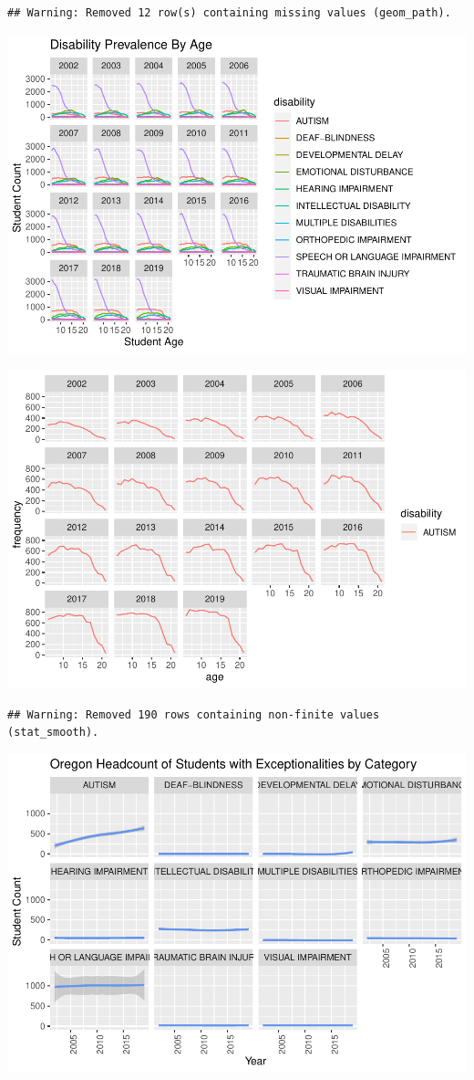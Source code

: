 \documentclass[
  english,
  man]{apa6}
\begin{document}
\begin{verbatim}
## Warning: Removed 12 row(s) containing missing values (geom_path).
\end{verbatim}

\includegraphics{draft_play_files/figure-latex/Oregon plot-1.pdf}

\includegraphics{draft_play_files/figure-latex/unnamed-chunk-1-1.pdf}

\begin{verbatim}
## Warning: Removed 190 rows containing non-finite values (stat_smooth).
\end{verbatim}

\includegraphics{draft_play_files/figure-latex/unnamed-chunk-2-1.pdf}
\end{document}
